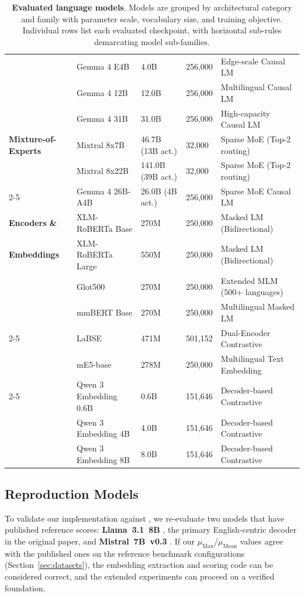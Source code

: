 \begin{table}[!htbp]
\begin{tabularx}{\textwidth}{@{}p{2.6cm} p{3.2cm} p{1.7cm} p{1.5cm} X@{}}
  & Gemma 4 E4B & 4.0B & 256,000 & Edge-scale Causal LM \\
  & Gemma 4 12B & 12.0B & 256,000 & Multilingual Causal LM \\
  & Gemma 4 31B & 31.0B & 256,000 & High-capacity Causal LM \\
\midrule
\textbf{Mixture-of-Experts}
  & Mixtral 8x7B & 46.7B (13B act.) & 32,000 & Sparse MoE (Top-2 routing) \\
  & Mixtral 8x22B & 141.0B (39B act.) & 32,000 & Sparse MoE (Top-2 routing) \\
  \cmidrule(lr){2-5}
  & Gemma 4 26B-A4B & 26.0B (4B act.) & 256,000 & Sparse MoE Causal LM \\
\midrule
\textbf{Encoders \&}
  & XLM-RoBERTa Base & 270M & 250,000 & Masked LM (Bidirectional) \\
\textbf{Embeddings}
  & XLM-RoBERTa Large & 550M & 250,000 & Masked LM (Bidirectional) \\
  & Glot500 & 270M & 250,000 & Extended MLM (500+ languages) \\
  & mmBERT Base & 270M & 250,000 & Multilingual Masked LM \\
  \cmidrule(lr){2-5}
  & LaBSE & 471M & 501,152 & Dual-Encoder Contrastive \\
  & mE5-base & 278M & 250,000 & Multilingual Text Embedding \\
  \cmidrule(lr){2-5}
  & Qwen 3 Embedding 0.6B & 0.6B & 151,646 & Decoder-based Contrastive \\
  & Qwen 3 Embedding 4B & 4.0B & 151,646 & Decoder-based Contrastive \\
  & Qwen 3 Embedding 8B & 8.0B & 151,646 & Decoder-based Contrastive \\
\bottomrule
\end{tabularx}
\caption{\textbf{Evaluated language models}. Models are grouped by architectural category and family with parameter scale, vocabulary size, and training objective. Individual rows list each evaluated checkpoint, with horizontal sub-rules demarcating model sub-families.}
\label{tab:evaluated-models-spec}
\end{table}

\subsection{Reproduction Models}
\label{subsec:reproduction-models}

To validate our implementation against \citet{kargaran2025mexa}, we re-evaluate two models that have published reference scores: \textbf{Llama~3.1~8B} \citep{dubey2024llama3}, the primary English-centric decoder in the original paper, and \textbf{Mistral~7B~v0.3} \citep{jiang2023mistral}. If our $\mu_{\text{Max}}$/$\mu_{\text{Mean}}$ values agree with the published ones on the reference benchmark configurations (Section~\ref{sec:datasets}), the embedding extraction and scoring code can be considered correct, and the extended experiments can proceed on a verified foundation.

